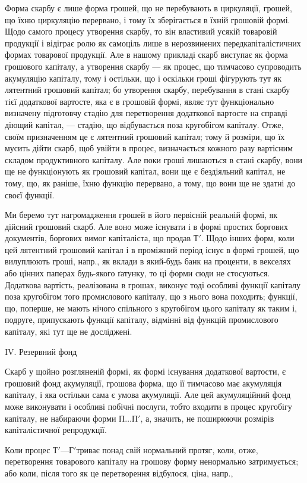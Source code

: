 Форма скарбу є лише форма грошей, що не перебувають в циркуляції,
грошей, що їхню циркуляцію перервано, і тому їх зберігається
в їхній грошовій формі. Щодо самого процесу утворення скарбу, то
він властивий усякій товаровій продукції і відіграє ролю як самоціль
лише в нерозвинених передкапіталістичних формах товарової продукції.
Але в нашому прикладі скарб виступає як форма грошового капіталу, а
утворення скарбу — як процес, що тимчасово супроводить акумуляцію
капіталу, тому і остільки, що і оскільки гроші фігурують тут як
лятентний грошовий капітал; бо утворення скарбу, перебування в стані
скарбу тієї додаткової вартосте, яка є в грошовій формі, являє тут функціонально
визначену підготовчу стадію для перетворення додаткової
вартосте на справді діющий капітал, — стадію, що відбувається поза
кругобігом капіталу. Отже, своїм призначенням це є лятентний грошовий
капітал; тому й розміри, що їх мусить дійти скарб, щоб увійти в
процес, визначається кожного разу вартісним складом продуктивного
капіталу. Але поки гроші лишаються в стані скарбу, вони ще не функціонують
як грошовий капітал, вони ще є бездіяльний капітал, не тому,
що, як раніше, їхню функцію перервано, а тому, що вони ще не здатні
до своєї функції.

Ми беремо тут нагромадження грошей в його первісній реальній
формі, як дійсний грошовий скарб. Але воно може існувати і в
формі простих боргових документів, боргових вимог капіталіста,
що продав $Т'$. Щодо інших форм, коли цей лятентний грошовий
капітал і в проміжний період існує в формі грошей, що вилуплюють
гроші, напр., як вклади в який-будь банк на проценти, в векселях
або цінних паперах будь-якого ґатунку, то ці форми сюди не стосуються.
Додаткова вартість, реалізована в грошах, виконує тоді особливі функції
капіталу поза кругобігом того промислового капіталу, що з нього
вона походить; функції, що, поперше, не мають нічого спільного з кругобігом
цього капіталу як таким і, подруге, припускають функції капіталу,
відмінні від функцій промислового капіталу, які тут ще не досліджені.

IV. Резервний фонд

Скарб у щойно розгляненій формі, як формі існування додаткової
вартости, є грошовий фонд акумуляції, грошова форма, що її тимчасово
має акумуляція капіталу, і яка остільки сама є умова акумуляції.
Але цей акумуляційний фонд може виконувати і особливі побічні послуги,
тобто входити в процес кругобігу капіталу, не набираючи форми $П\dots{} П'$,
а, значить, не поширюючи розмірів капіталістичної репродукції.

Коли процес $Т' — Г' т$риває понад свій нормальний протяг, коли, отже,
перетворення товарового капіталу на грошову форму ненормально затримується;
або коли, після того як це перетворення відбулося, ціна, напр.,
\parbreak{}  %
